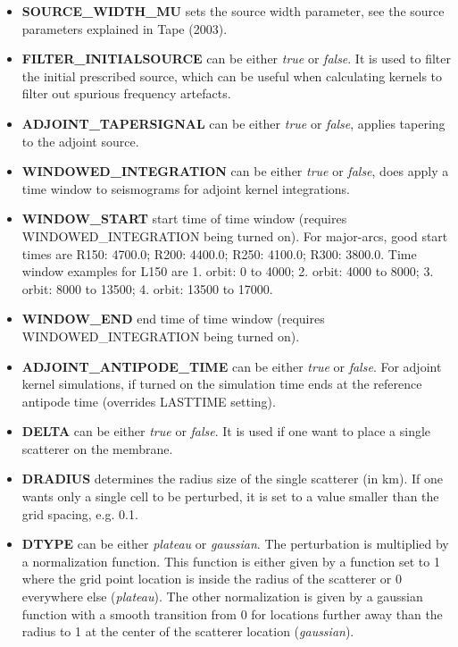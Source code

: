 \documentclass[a4paper,
                          headsepline,
                          listof=totoc,
                          toc=listof,
                          headings=small]{scrreprt} %
\begin{document}
\begin{itemize}
\item \textbf{SOURCE\_WIDTH\_MU}
sets the source width parameter, see the source parameters explained in {Tape} (2003).

\item \textbf{FILTER\_INITIALSOURCE}
can be either \textit{true} or \textit{false}. It is used to filter the initial prescribed source,
which can be useful when calculating kernels to filter out spurious frequency artefacts.

\item \textbf{ADJOINT\_TAPERSIGNAL}
can be either \textit{true} or \textit{false}, applies tapering to the adjoint source.

\item \textbf{WINDOWED\_INTEGRATION}
can be either \textit{true} or \textit{false}, does apply a time window to seismograms
for adjoint kernel integrations.

\item \textbf{WINDOW\_START}
start time of time window (requires WINDOWED\_INTEGRATION being turned on).
For major-arcs, good start times are R150: 4700.0;  R200: 4400.0; R250: 4100.0; R300: 3800.0.
Time window examples for L150 are 1. orbit: 0 to 4000; 2. orbit: 4000 to 8000; 3. orbit: 8000 to 13500; 4. orbit:  13500 to 17000.

\item \textbf{WINDOW\_END}
end time of time window (requires WINDOWED\_INTEGRATION being turned on).

\item \textbf{ADJOINT\_ANTIPODE\_TIME}
can be either \textit{true} or \textit{false}.
For adjoint kernel simulations, if turned on the simulation time ends at the reference antipode time
(overrides LASTTIME setting).



\item \textbf{DELTA}
can be either \textit{true} or \textit{false}. It is used if one want to place a single scatterer
on the membrane.

\item \textbf{DRADIUS}
determines the radius size of the single scatterer (in km). If one wants only a single cell
to be perturbed, it is set to a value smaller than the grid spacing, e.g. 0.1.

\item \textbf{DTYPE}
can be either \textit{plateau} or \textit{gaussian}. The perturbation is multiplied by
a normalization function. This function is either given by
a function set to 1 where the grid point location is inside the radius of the scatterer
or 0 everywhere else (\textit{plateau}). The other normalization is given by a gaussian function with a smooth transition from 0 for locations further away
than the radius to 1 at the center of the scatterer location (\textit{gaussian}).


\end{itemize}
\end{document}
